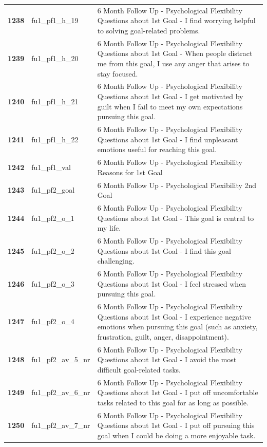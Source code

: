 \documentclass[
  letterpaper,
  DIV=11,
  numbers=noendperiod]{scrartcl}
\begin{document}
\begin{longtable}[t]{>{}cll}
\textbf{1238} & fu1\_pf1\_h\_19 & 6 Month Follow Up - Psychological Flexibility Questions about 1st Goal - I find worrying helpful to solving goal-related problems.\\
\textbf{1239} & fu1\_pf1\_h\_20 & 6 Month Follow Up - Psychological Flexibility Questions about 1st Goal - When people distract me from this goal, I use any anger that arises to stay focused.\\
\textbf{1240} & fu1\_pf1\_h\_21 & 6 Month Follow Up - Psychological Flexibility Questions about 1st Goal - I get motivated by guilt when I fail to meet my own expectations pursuing this goal.\\
\addlinespace
\textbf{1241} & fu1\_pf1\_h\_22 & 6 Month Follow Up - Psychological Flexibility Questions about 1st Goal - I find unpleasant emotions useful for reaching this goal.\\
\textbf{1242} & fu1\_pf1\_val & 6 Month Follow Up - Psychological Flexibility Reasons for 1st Goal\\
\textbf{1243} & fu1\_pf2\_goal & 6 Month Follow Up - Psychological Flexibility 2nd Goal\\
\textbf{1244} & fu1\_pf2\_o\_1 & 6 Month Follow Up - Psychological Flexibility Questions about 1st Goal - This goal is central to my life.\\
\textbf{1245} & fu1\_pf2\_o\_2 & 6 Month Follow Up - Psychological Flexibility Questions about 1st Goal - I find this goal challenging.\\
\addlinespace
\textbf{1246} & fu1\_pf2\_o\_3 & 6 Month Follow Up - Psychological Flexibility Questions about 1st Goal - I feel stressed when pursuing this goal.\\
\textbf{1247} & fu1\_pf2\_o\_4 & 6 Month Follow Up - Psychological Flexibility Questions about 1st Goal - I experience negative emotions when pursuing this goal (such as anxiety, frustration, guilt, anger, disappointment).\\
\textbf{1248} & fu1\_pf2\_av\_5\_nr & 6 Month Follow Up - Psychological Flexibility Questions about 1st Goal - I avoid the most difficult goal-related tasks.\\
\textbf{1249} & fu1\_pf2\_av\_6\_nr & 6 Month Follow Up - Psychological Flexibility Questions about 1st Goal - I put off uncomfortable tasks related to this goal for as long as possible.\\
\textbf{1250} & fu1\_pf2\_av\_7\_nr & 6 Month Follow Up - Psychological Flexibility Questions about 1st Goal - I put off pursuing this goal when I could be doing a more enjoyable task.\\

\end{longtable}
\end{document}
